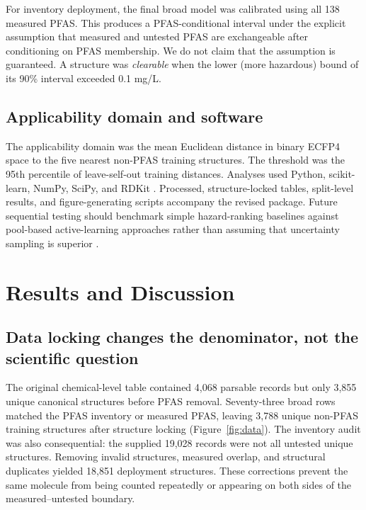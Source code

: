 \documentclass[journal=esthag,manuscript=article,margin=1in]{achemso}
\begin{document}
For inventory deployment, the final broad model was calibrated using all 138 measured PFAS. This produces a PFAS-conditional interval under the explicit assumption that measured and untested PFAS are exchangeable after conditioning on PFAS membership. We do not claim that the assumption is guaranteed. A structure was \emph{clearable} when the lower (more hazardous) bound of its 90\% interval exceeded 0.1 mg/L.

\subsection{Applicability domain and software}

The applicability domain was the mean Euclidean distance in binary ECFP4 space to the five nearest non-PFAS training structures. The threshold was the 95th percentile of leave-self-out training distances. Analyses used Python, scikit-learn, NumPy, SciPy, and RDKit \cite{sklearn,rdkit}. Processed, structure-locked tables, split-level results, and figure-generating scripts accompany the revised package. Future sequential testing should benchmark simple hazard-ranking baselines against pool-based active-learning approaches rather than assuming that uncertainty sampling is superior \cite{settles2009active,graff2021molpal,smith2018less,lookman2019active}.

\section{Results and Discussion}

\subsection{Data locking changes the denominator, not the scientific question}

The original chemical-level table contained 4,068 parsable records but only 3,855 unique canonical structures before PFAS removal. Seventy-three broad rows matched the PFAS inventory or measured PFAS, leaving 3,788 unique non-PFAS training structures after structure locking (Figure~\ref{fig:data}). The inventory audit was also consequential: the supplied 19,028 records were not all untested unique structures. Removing invalid structures, measured overlap, and structural duplicates yielded 18,851 deployment structures. These corrections prevent the same molecule from being counted repeatedly or appearing on both sides of the measured--untested boundary.
\end{document}
